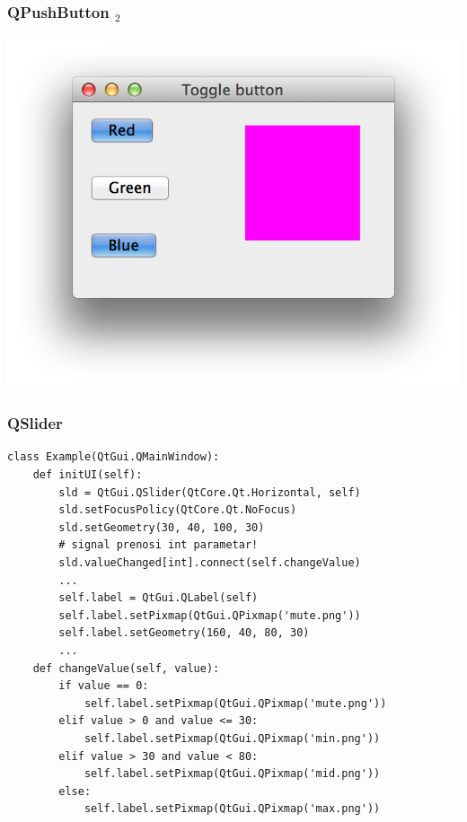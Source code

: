 \documentclass[utf8,compress]{beamer}
\begin{document}
\begin{frame}[fragile]
  \frametitle{QPushButton $_2$}
\begin{center}
\includegraphics[scale=0.5]{pyqt13.png}
\end{center}
\end{frame}

\begin{frame}
  \frametitle{QSlider}
\begin{verbatim}
class Example(QtGui.QMainWindow):
    def initUI(self):
        sld = QtGui.QSlider(QtCore.Qt.Horizontal, self)
        sld.setFocusPolicy(QtCore.Qt.NoFocus)
        sld.setGeometry(30, 40, 100, 30)
        # signal prenosi int parametar!
        sld.valueChanged[int].connect(self.changeValue)
        ...
        self.label = QtGui.QLabel(self)
        self.label.setPixmap(QtGui.QPixmap('mute.png'))
        self.label.setGeometry(160, 40, 80, 30)
        ...
    def changeValue(self, value):
        if value == 0:
            self.label.setPixmap(QtGui.QPixmap('mute.png'))
        elif value > 0 and value <= 30:
            self.label.setPixmap(QtGui.QPixmap('min.png'))
        elif value > 30 and value < 80:
            self.label.setPixmap(QtGui.QPixmap('mid.png'))
        else:
            self.label.setPixmap(QtGui.QPixmap('max.png'))
\end{verbatim}
\end{frame}
\end{document}
